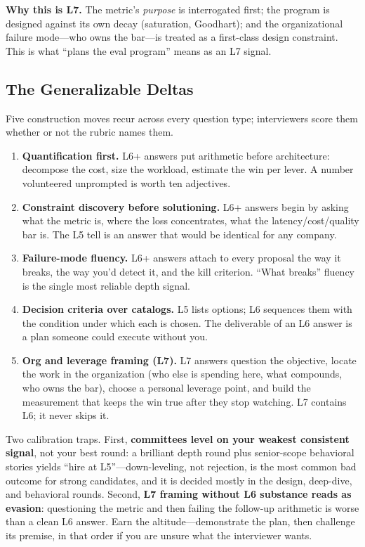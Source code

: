 \textbf{Why this is L7.} The metric's \textit{purpose} is interrogated first; the program is designed against its own decay (saturation, Goodhart); and the organizational failure mode---who owns the bar---is treated as a first-class design constraint. This is what ``plans the eval program'' means as an L7 signal.

\subsection{The Generalizable Deltas}

\begin{keyinsight}
Five construction moves recur across every question type; interviewers score them whether or not the rubric names them.
\begin{enumerate}
    \item \textbf{Quantification first.} L6+ answers put arithmetic before architecture: decompose the cost, size the workload, estimate the win per lever. A number volunteered unprompted is worth ten adjectives.
    \item \textbf{Constraint discovery before solutioning.} L6+ answers begin by asking what the metric is, where the loss concentrates, what the latency/cost/quality bar is. The L5 tell is an answer that would be identical for any company.
    \item \textbf{Failure-mode fluency.} L6+ answers attach to every proposal the way it breaks, the way you'd detect it, and the kill criterion. ``What breaks'' fluency is the single most reliable depth signal.
    \item \textbf{Decision criteria over catalogs.} L5 lists options; L6 sequences them with the condition under which each is chosen. The deliverable of an L6 answer is a plan someone could execute without you.
    \item \textbf{Org and leverage framing (L7).} L7 answers question the objective, locate the work in the organization (who else is spending here, what compounds, who owns the bar), choose a personal leverage point, and build the measurement that keeps the win true after they stop watching. L7 contains L6; it never skips it.
\end{enumerate}
\end{keyinsight}

\begin{warningbox}
Two calibration traps. First, \textbf{committees level on your weakest consistent signal}, not your best round: a brilliant depth round plus senior-scope behavioral stories yields ``hire at L5''---down-leveling, not rejection, is the most common bad outcome for strong candidates, and it is decided mostly in the design, deep-dive, and behavioral rounds. Second, \textbf{L7 framing without L6 substance reads as evasion}: questioning the metric and then failing the follow-up arithmetic is worse than a clean L6 answer. Earn the altitude---demonstrate the plan, then challenge its premise, in that order if you are unsure what the interviewer wants.
\end{warningbox}

